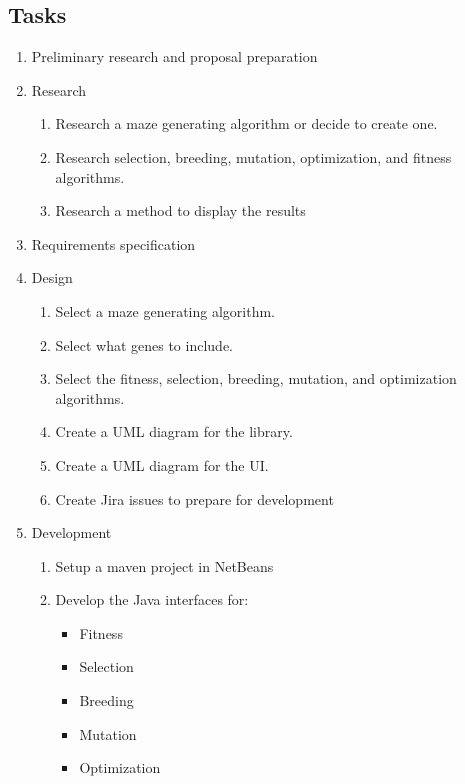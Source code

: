 \documentclass[letterpaper, 12pt]{article}
\begin{document}
  \subsection{Tasks}
  \begin{enumerate}
	 \item\label{proposal} Preliminary research and proposal preparation
	 \item\label{research} Research
		\begin{enumerate}
		  \item\label{r:maze} Research a maze generating algorithm or decide to create one.
		  \item\label{r:algorithms} Research selection, breeding, mutation, optimization, and fitness algorithms.
		  \item\label{r:display} Research a method to display the results
		\end{enumerate}
	 \item\label{srs} Requirements specification
	 \item\label{design} Design
		\begin{enumerate} 
		  \item\label{d:maze} Select a maze generating algorithm.
		  \item\label{d:genes} Select what genes to include.
		  \item\label{d:algorithms} Select the fitness, selection, breeding, mutation, and optimization algorithms.
		  \item\label{d:UML} Create a UML diagram for the library.
		  \item\label{d:display} Create a UML diagram for the UI.
		  \item\label{d:jira} Create Jira issues to prepare for development
		\end{enumerate}
	 \item\label{development} Development
		\begin{enumerate}
		  \item\label{dev:netbeans} Setup a maven project in NetBeans
		  \item\label{dev:interfaces} Develop the Java interfaces for:
			 \begin{itemize}
				\item\label{dev:i:fitness} Fitness
				\item\label{dev:i:selection} Selection
				\item\label{dev:i:breeding} Breeding
				\item\label{dev:i:mutation} Mutation
				\item\label{dev:i:optimization} Optimization

\end{itemize}
\end{enumerate}
\end{enumerate}
\end{document}
